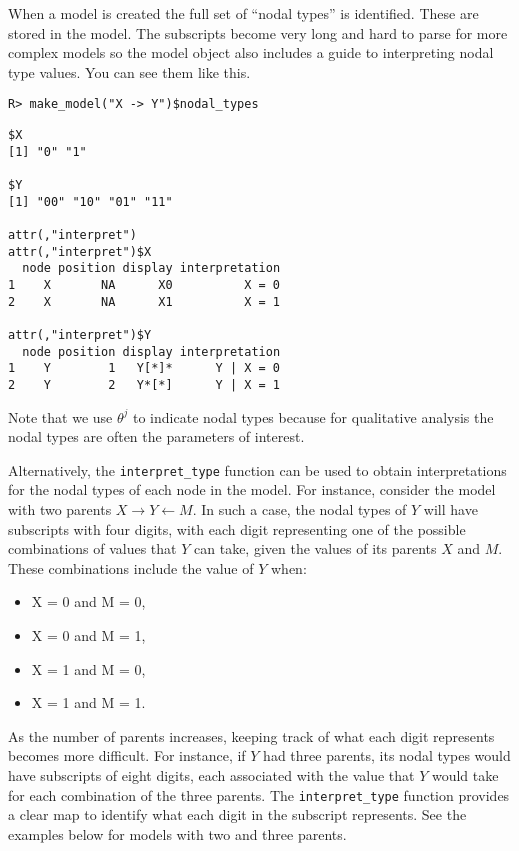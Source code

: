 \documentclass[
  11pt,
  article]{jss}
\providecommand{\tightlist}{%
  \setlength{\itemsep}{0pt}\setlength{\parskip}{0pt}}\usepackage{longtable,booktabs,array}
\begin{document}
When a model is created the full set of ``nodal types'' is identified.
These are stored in the model. The subscripts become very long and hard
to parse for more complex models so the model object also includes a
guide to interpreting nodal type values. You can see them like this.

\begin{verbatim}
R> make_model("X -> Y")$nodal_types
\end{verbatim}

\begin{verbatim}
$X
[1] "0" "1"

$Y
[1] "00" "10" "01" "11"

attr(,"interpret")
attr(,"interpret")$X
  node position display interpretation
1    X       NA      X0          X = 0
2    X       NA      X1          X = 1

attr(,"interpret")$Y
  node position display interpretation
1    Y        1   Y[*]*      Y | X = 0
2    Y        2   Y*[*]      Y | X = 1
\end{verbatim}

Note that we use \(\theta^j\) to indicate nodal types because for
qualitative analysis the nodal types are often the parameters of
interest.

Alternatively, the \texttt{interpret\_type} function can be used to
obtain interpretations for the nodal types of each node in the model.
For instance, consider the model with two parents
\(X \rightarrow Y \leftarrow M.\) In such a case, the nodal types of
\(Y\) will have subscripts with four digits, with each digit
representing one of the possible combinations of values that \(Y\) can
take, given the values of its parents \(X\) and \(M.\) These
combinations include the value of \(Y\) when:

\begin{itemize}
\tightlist
\item
  X = 0 and M = 0,
\item
  X = 0 and M = 1,
\item
  X = 1 and M = 0,
\item
  X = 1 and M = 1.
\end{itemize}

As the number of parents increases, keeping track of what each digit
represents becomes more difficult. For instance, if \(Y\) had three
parents, its nodal types would have subscripts of eight digits, each
associated with the value that \(Y\) would take for each combination of
the three parents. The \texttt{interpret\_type} function provides a
clear map to identify what each digit in the subscript represents. See
the examples below for models with two and three parents.
\end{document}
